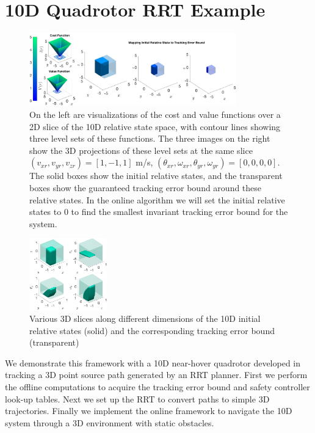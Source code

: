 \section{10D Quadrotor RRT Example \label{sec:results}}
\begin{figure}
	\centering
	\includegraphics[width=0.8\textwidth]{fig/quad10D_example_cost}
	\caption{On the left are visualizations of the cost and value functions over a 2D slice of the 10D relative state space, with contour lines showing three level sets of these functions. The three images on the right show the 3D projections of these level sets at the same slice $(v_{xr},v_{yr},v_{zr})=[1, -1, 1]$ m/s, $(\theta_{xr},\omega_{xr},\theta_{yr},\omega_{yr})=[0,0,0,0]$. The solid boxes show the initial relative states, and the transparent boxes show the guaranteed tracking error bound around these relative states. In the online algorithm we will set the initial relative states to 0 to find the smallest invariant tracking error bound for the system.}
	\label{fig:quad10D_example}
	\end{figure} 
\begin{figure}
	\centering
	\includegraphics[width=0.3\textwidth]{fig/quad10D_slices}
	\caption{Various 3D slices along different dimensions of the 10D initial relative states (solid) and the corresponding tracking error bound (transparent)}
	\label{fig:quad10D_example_slices}
\end{figure} 
We demonstrate this framework with a 10D near-hover quadrotor developed in \cite{Bouffard12} tracking a 3D point source path generated by an RRT planner. First we perform the offline computations to acquire the tracking error bound and safety controller look-up tables. Next we set up the RRT to convert paths to simple 3D trajectories. Finally we implement the online framework to navigate the 10D system through a 3D environment with static obstacles.

